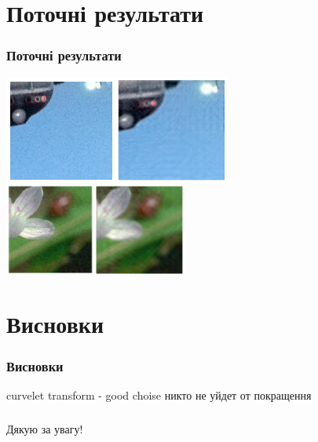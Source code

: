 \documentclass[12pt]{beamer}
\begin{document}
\section{Поточні результати}
\begin{frame}\frametitle{Поточні результати}
	\includegraphics[height=3.5cm]{images/res_algo_1} \newline
	\includegraphics[height=3cm]{images/res_algo_2}
\end{frame}

\section{Висновки}
\begin{frame}\frametitle{Висновки }
	curvelet transform - good choise \newline
	никто не уйдет от покращення
\end{frame}

\begin{frame}\frametitle{}
	Дякую за увагу!
\end{frame}
\end{document}
